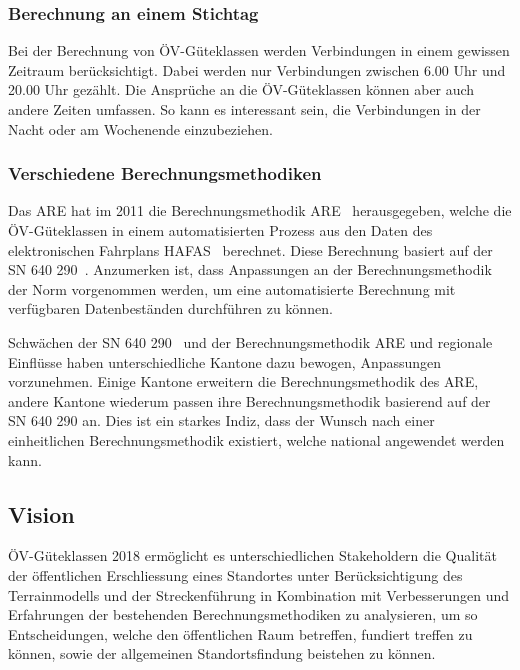 \subsubsection{Berechnung an einem Stichtag}
\label{Problemstellung:Berechnung an einem Stichtag}

Bei der Berechnung von \acs{ÖV}-Güteklassen werden Verbindungen in einem gewissen Zeitraum berücksichtigt.
Dabei werden nur Verbindungen zwischen 6.00 Uhr und 20.00 Uhr gezählt.
Die Ansprüche an die \acs{ÖV}-Güteklassen können aber auch andere Zeiten umfassen.
So kann es interessant sein, die Verbindungen in der Nacht oder am Wochenende einzubeziehen.

\subsubsection{Verschiedene Berechnungsmethodiken}
\label{Problemstellung:Verschiedene Berechnungsmethodiken}

Das \acl{ARE} hat im 2011 die Berechnungsmethodik \acs{ARE}~\cite{berechnung_are} herausgegeben, welche die \acs{ÖV}-Güteklassen in einem automatisierten Prozess aus den Daten des elektronischen Fahrplans HAFAS~\cite{sbb_hafas_spec} berechnet.
Diese Berechnung basiert auf der \acs{SN} 640 290~\cite{sn640290}.
Anzumerken ist, dass Anpassungen an der Berechnungsmethodik der Norm vorgenommen werden, um eine automatisierte Berechnung mit verfügbaren Datenbeständen durchführen zu können.

Schwächen der \acs{SN} 640 290~\cite{sn640290} und der Berechnungsmethodik \acs{ARE} und regionale Einflüsse haben unterschiedliche Kantone dazu bewogen, Anpassungen vorzunehmen.
Einige Kantone erweitern die Berechnungsmethodik des \acs{ARE}, andere Kantone wiederum passen ihre Berechnungsmethodik basierend auf der \acs{SN} 640 290 an.
Dies ist ein starkes Indiz, dass der Wunsch nach einer einheitlichen Berechnungsmethodik existiert, welche national angewendet werden kann.

\subsection{Vision}
\label{Einführung:Vision}

\acs{ÖV}-Güteklassen 2018 ermöglicht es unterschiedlichen Stakeholdern die Qualität der öffentlichen Erschliessung eines Standortes unter Berücksichtigung des \gls{Terrainmodell}s und der Streckenführung in Kombination mit Verbesserungen und Erfahrungen der bestehenden Berechnungsmethodiken zu analysieren, um so Entscheidungen, welche den öffentlichen Raum betreffen, fundiert treffen zu können, sowie der allgemeinen Standortsfindung beistehen zu können.

